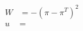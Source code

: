 \documentclass[12pt,a4paper]{article}
\begin{document}

\begin{align}
    W & = -\left(\pi - \pi^T\right)^2 \\
    u & = 
\end{align}

\newpage


\end{document}
